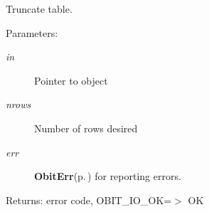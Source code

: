 Truncate table. 

\begin{Desc}
\item[Parameters:]
\begin{description}
\item[{\em in}]Pointer to object \item[{\em nrows}]Number of rows desired \item[{\em err}]{\bf Obit\-Err}{\rm (p.\,\pageref{structObitErr})} for reporting errors. \end{description}
\end{Desc}
\begin{Desc}
\item[Returns:]error code, OBIT\_\-IO\_\-OK=$>$ OK \end{Desc}
